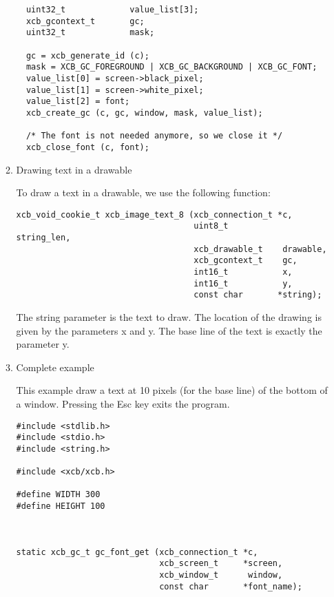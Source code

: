 \documentclass[12pt,oneside,titlepage]{book}
\begin{document}
\begin{enumerate}
\begin{enumerate}
\begin{verbatim}
  uint32_t             value_list[3];
  xcb_gcontext_t       gc;
  uint32_t             mask;

  gc = xcb_generate_id (c);
  mask = XCB_GC_FOREGROUND | XCB_GC_BACKGROUND | XCB_GC_FONT;
  value_list[0] = screen->black_pixel;
  value_list[1] = screen->white_pixel;
  value_list[2] = font;
  xcb_create_gc (c, gc, window, mask, value_list);

  /* The font is not needed anymore, so we close it */
  xcb_close_font (c, font);
\end{verbatim}
  \item
    \protect\hypertarget{drawingtext}{}{Drawing text in a drawable}

    To draw a text in a drawable, we use the following function:

\begin{verbatim}
xcb_void_cookie_t xcb_image_text_8 (xcb_connection_t *c,
                                    uint8_t           string_len,
                                    xcb_drawable_t    drawable,
                                    xcb_gcontext_t    gc,
                                    int16_t           x,
                                    int16_t           y,
                                    const char       *string);
\end{verbatim}

    The {string} parameter is the text to draw. The location of the
    drawing is given by the parameters {x} and {y}. The base line of the
    text is exactly the parameter {y}.
  \item
    \protect\hypertarget{fontcompleteexample}{}{Complete example}

    This example draw a text at 10 pixels (for the base line) of the
    bottom of a window. Pressing the Esc key exits the program.

\begin{verbatim}
#include <stdlib.h>
#include <stdio.h>
#include <string.h>

#include <xcb/xcb.h>

#define WIDTH 300
#define HEIGHT 100



static xcb_gc_t gc_font_get (xcb_connection_t *c,
                             xcb_screen_t     *screen,
                             xcb_window_t      window,
                             const char       *font_name);


\end{verbatim}
\end{enumerate}
\end{enumerate}
\end{document}
